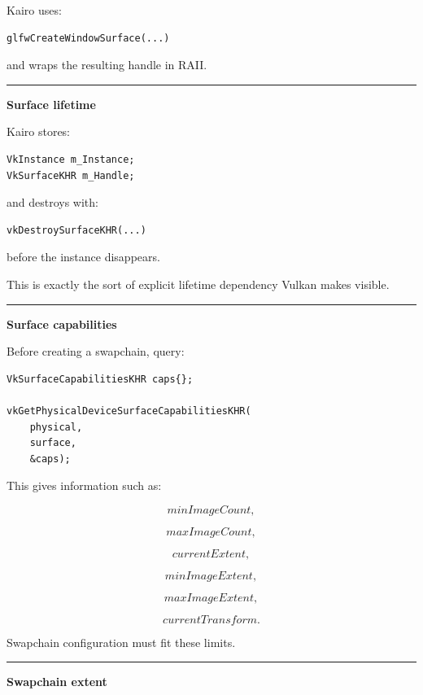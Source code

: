 Kairo uses:

\begin{verbatim}
glfwCreateWindowSurface(...)
\end{verbatim}

and wraps the resulting handle in RAII.

\begin{center}\rule{0.5\linewidth}{0.5pt}\end{center}

\textbf{Surface lifetime}

Kairo stores:

\begin{verbatim}
VkInstance m_Instance;
VkSurfaceKHR m_Handle;
\end{verbatim}

and destroys with:

\begin{verbatim}
vkDestroySurfaceKHR(...)
\end{verbatim}

before the instance disappears.

This is exactly the sort of explicit lifetime dependency Vulkan makes visible.

\begin{center}\rule{0.5\linewidth}{0.5pt}\end{center}

\textbf{Surface capabilities}

Before creating a swapchain, query:

\begin{verbatim}
VkSurfaceCapabilitiesKHR caps{};

vkGetPhysicalDeviceSurfaceCapabilitiesKHR(
    physical,
    surface,
    &caps);
\end{verbatim}

This gives information such as:

\[
minImageCount,
\]

\[
maxImageCount,
\]

\[
currentExtent,
\]

\[
minImageExtent,
\]

\[
maxImageExtent,
\]

\[
currentTransform.
\]

Swapchain configuration must fit these limits.

\begin{center}\rule{0.5\linewidth}{0.5pt}\end{center}

\textbf{Swapchain extent}

